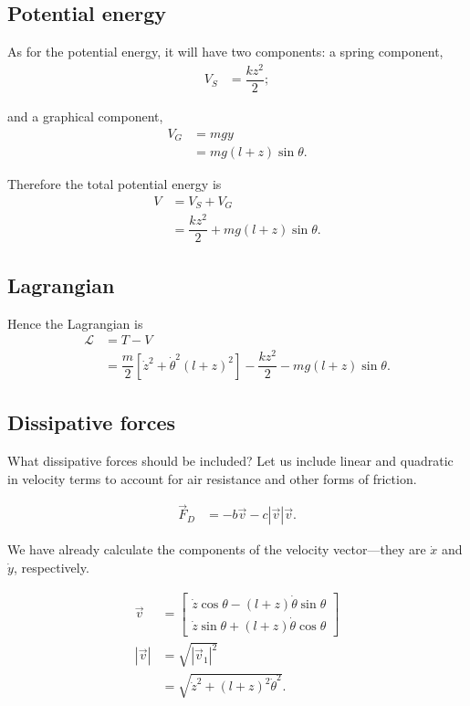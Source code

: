 \documentclass[12pt,a4paper,portrait]{article}
\newcommand{\lag}{\mathcal{L}}
\begin{document}
\subsection{Potential energy}
As for the potential energy, it will have two components: a spring component,
\begin{align*}
	V_S &= \dfrac{kz^2}{2};
\end{align*}

and a graphical component,
\begin{align*}
	V_G &= mgy \\
	&= mg(l+z)\sin{\theta}.
\end{align*}

Therefore the total potential energy is
\begin{align*}
	V &= V_S + V_G \\
	&= \dfrac{kz^2}{2} + mg(l+z)\sin{\theta}.
\end{align*}

\subsection{Lagrangian}
Hence the Lagrangian is
\begin{align*}
	\lag &= T - V \\
	&= \dfrac{m}{2} \left[\dot{z}^2 + \dot{\theta}^2(l+z)^2\right] - \dfrac{kz^2}{2} - mg(l+z)\sin{\theta}.
\end{align*}

\subsection{Dissipative forces}
What dissipative forces should be included? Let us include linear and quadratic in velocity terms to account for air resistance and other forms of friction. 

\begin{align*}
	\vec{F}_D &= -b\vec{v} - c|\vec{v}|\vec{v}.
\end{align*}

We have already calculate the components of the velocity vector---they are $\dot{x}$ and $\dot{y}$, respectively. 

\begin{align*}
	\vec{v} &= \begin{bmatrix}
		\dot{z}\cos{\theta} - (l+z)\dot{\theta}\sin{\theta} \\
		\dot{z}\sin{\theta} + (l+z)\dot{\theta}\cos{\theta}
	\end{bmatrix}\\
	|\vec{v}| &= \sqrt{|\vec{v}_1|^2}\\
	&= \sqrt{\dot{z}^2+(l+z)^2\dot{\theta}^2}.
\end{align*}
\end{document}
